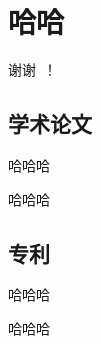 \documentclass{cqupt_thesis}
\begin{document}
    \section{哈哈}


    \begin{acknowledgements}
        谢谢~！
    \end{acknowledgements}

    \begin{mastermainwork}
        \subsection*{学术论文}
        \begin{achievements}
            \item 哈哈哈
            \item 哈哈哈
        \end{achievements}
        \subsection*{专利}
        \begin{achievements}
            \item 哈哈哈
            \item 哈哈哈
        \end{achievements}
    \end{mastermainwork}
\end{document}
